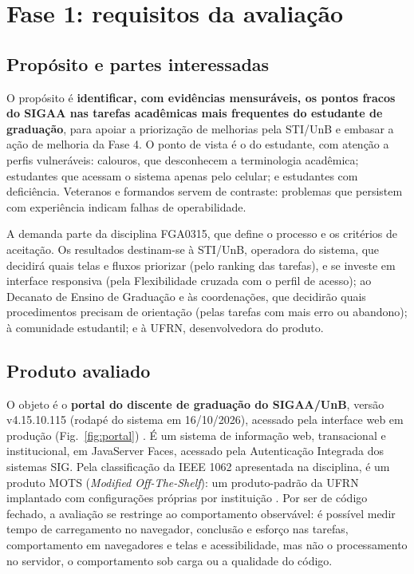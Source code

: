 \section{Fase 1: requisitos da avaliação}
\label{sec:fase1}

\subsection{Propósito e partes interessadas}

O propósito é \textbf{identificar, com evidências mensuráveis, os pontos fracos do SIGAA nas tarefas acadêmicas mais frequentes do estudante de graduação}, para apoiar a priorização de melhorias pela STI/UnB e embasar a ação de melhoria da Fase 4. O ponto de vista é o do estudante, com atenção a perfis vulneráveis: calouros, que desconhecem a terminologia acadêmica; estudantes que acessam o sistema apenas pelo celular; e estudantes com deficiência. Veteranos e formandos servem de contraste: problemas que persistem com experiência indicam falhas de operabilidade.

A demanda parte da disciplina FGA0315, que define o processo e os critérios de aceitação. Os resultados destinam-se à STI/UnB, operadora do sistema, que decidirá quais telas e fluxos priorizar (pelo ranking das tarefas), e se investe em interface responsiva (pela Flexibilidade cruzada com o perfil de acesso); ao Decanato de Ensino de Graduação e às coordenações, que decidirão quais procedimentos precisam de orientação (pelas tarefas com mais erro ou abandono); à comunidade estudantil; e à UFRN, desenvolvedora do produto.

\subsection{Produto avaliado}
\label{sec:produto}

O objeto é o \textbf{portal do discente de graduação do SIGAA/UnB}, versão v4.15.10.115 (rodapé do sistema em 16/10/2026), acessado pela interface web em produção (Fig.~\ref{fig:portal}) \cite{sigaa}. É um sistema de informação web, transacional e institucional, em JavaServer Faces, acessado pela Autenticação Integrada dos sistemas SIG. Pela classificação da IEEE 1062 apresentada na disciplina, é um produto MOTS (\textit{Modified Off-The-Shelf}): um produto-padrão da UFRN implantado com configurações próprias por instituição \cite{ramos2026processo}. Por ser de código fechado, a avaliação se restringe ao comportamento observável: é possível medir tempo de carregamento no navegador, conclusão e esforço nas tarefas, comportamento em navegadores e telas e acessibilidade, mas não o processamento no servidor, o comportamento sob carga ou a qualidade do código.

